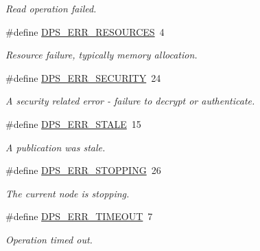 \begin{DoxyCompactItemize}
\begin{DoxyCompactList}\small\item\em Read operation failed. \end{DoxyCompactList}\item 
\mbox{\label{group__status_ga09dd06b53fdfdc87406d380de331b75b}} 
\#define \hyperlink{group__status_ga09dd06b53fdfdc87406d380de331b75b}{D\+P\+S\+\_\+\+E\+R\+R\+\_\+\+R\+E\+S\+O\+U\+R\+C\+ES}~4
\begin{DoxyCompactList}\small\item\em Resource failure, typically memory allocation. \end{DoxyCompactList}\item 
\mbox{\label{group__status_gaa3bb7fee9a4a926de2df54a272446b5c}} 
\#define \hyperlink{group__status_gaa3bb7fee9a4a926de2df54a272446b5c}{D\+P\+S\+\_\+\+E\+R\+R\+\_\+\+S\+E\+C\+U\+R\+I\+TY}~24
\begin{DoxyCompactList}\small\item\em A security related error -\/ failure to decrypt or authenticate. \end{DoxyCompactList}\item 
\mbox{\label{group__status_ga01852545b0caefe96ff155d540bb3a68}} 
\#define \hyperlink{group__status_ga01852545b0caefe96ff155d540bb3a68}{D\+P\+S\+\_\+\+E\+R\+R\+\_\+\+S\+T\+A\+LE}~15
\begin{DoxyCompactList}\small\item\em A publication was stale. \end{DoxyCompactList}\item 
\mbox{\label{group__status_ga87337c85a55fcaf2dbaaf128362f6c8c}} 
\#define \hyperlink{group__status_ga87337c85a55fcaf2dbaaf128362f6c8c}{D\+P\+S\+\_\+\+E\+R\+R\+\_\+\+S\+T\+O\+P\+P\+I\+NG}~26
\begin{DoxyCompactList}\small\item\em The current node is stopping. \end{DoxyCompactList}\item 
\mbox{\label{group__status_gadac4ab9da07e3886e1e93a408e6963c4}} 
\#define \hyperlink{group__status_gadac4ab9da07e3886e1e93a408e6963c4}{D\+P\+S\+\_\+\+E\+R\+R\+\_\+\+T\+I\+M\+E\+O\+UT}~7
\begin{DoxyCompactList}\small\item\em Operation timed out. \end{DoxyCompactList}\item 

\end{DoxyCompactItemize}
